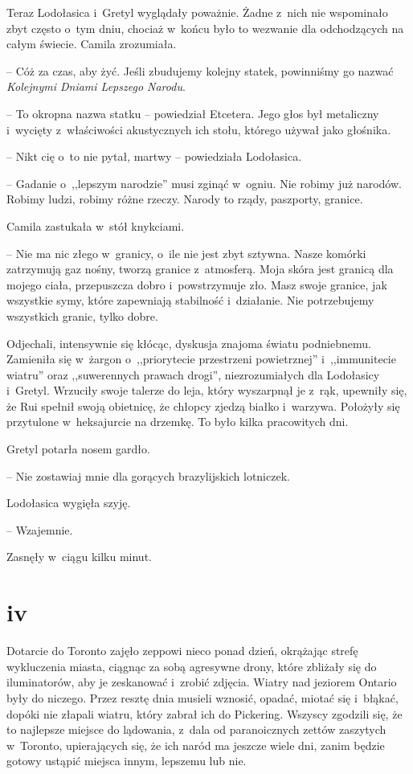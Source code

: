 \documentclass[oneside,polish,11pt,sfheadings]{mwbk}
\begin{document}
Teraz Lodołasica i~Gretyl wyglądały poważnie. Żadne z~nich nie
wspominało zbyt często o~tym dniu, chociaż w~końcu było to wezwanie dla
odchodzących na całym świecie. Camila zrozumiała.

-- Cóż za czas, aby żyć. Jeśli zbudujemy kolejny statek, powinniśmy go
nazwać \textit{Kolejnymi Dniami Lepszego Narodu}.

-- To okropna nazwa statku -- powiedział Etcetera. Jego głos był
metaliczny i~wycięty z~właściwości akustycznych ich stołu, którego
używał jako głośnika.

-- Nikt cię o~to nie pytał, martwy -- powiedziała Lodołasica.

-- Gadanie o~,,lepszym narodzie'' musi zginąć w~ogniu. Nie robimy już
narodów. Robimy ludzi, robimy różne rzeczy. Narody to rządy, paszporty,
granice.

Camila zastukała w~stół knykciami. 

-- Nie ma nic złego w~granicy, o~ile
nie jest zbyt sztywna. Nasze komórki zatrzymują gaz nośny, tworzą
granice z~atmosferą. Moja skóra jest granicą dla mojego ciała,
przepuszcza dobro i~powstrzymuje zło. Masz swoje granice, jak wszystkie
symy, które zapewniają stabilność i~działanie. Nie potrzebujemy
wszystkich granic, tylko dobre.

Odjechali, intensywnie się kłócąc, dyskusja znajoma światu podniebnemu.
Zamieniła się w~żargon o~,,priorytecie przestrzeni powietrznej'' i~,,immunitecie wiatru'' oraz ,,suwerennych prawach drogi'',
niezrozumiałych dla Lodołasicy i~Gretyl. Wrzuciły swoje talerze do leja,
który wyszarpnął je z~rąk, upewniły się, że Rui spełnił swoją obietnicę,
że chłopcy zjedzą białko i~warzywa. Położyły się przytulone w~heksajurcie na drzemkę. To było kilka pracowitych dni.

Gretyl potarła nosem gardło. 

-- Nie zostawiaj mnie dla gorących
brazylijskich lotniczek.

Lodołasica wygięła szyję. 

-- Wzajemnie.

Zasnęły w~ciągu kilku minut.

\chapter*{iv}

Dotarcie do Toronto zajęło zeppowi nieco ponad dzień, okrążając strefę
wykluczenia miasta, ciągnąc za sobą agresywne drony, które zbliżały się
do iluminatorów, aby je zeskanować i~zrobić zdjęcia. Wiatry nad jeziorem
Ontario były do niczego. Przez resztę dnia musieli wznosić, opadać,
miotać się i~błąkać, dopóki nie złapali wiatru, który zabrał ich do
Pickering. Wszyscy zgodzili się, że to najlepsze miejsce do lądowania, z~dala od paranoicznych zettów zaszytych w~Toronto, upierających się, że
ich naród ma jeszcze wiele dni, zanim będzie gotowy ustąpić miejsca
innym, lepszemu lub nie.
\end{document}
